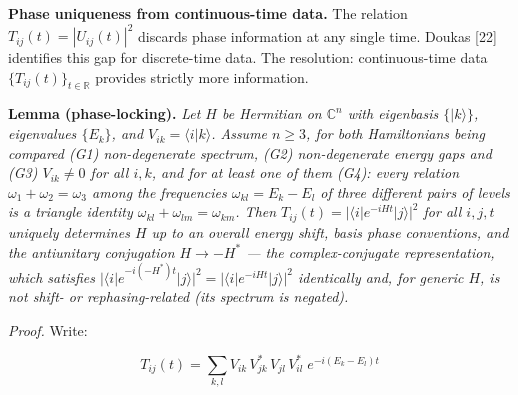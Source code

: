 \documentclass[
]{article}
\begin{document}
\textbf{Phase uniqueness from continuous-time data.} The relation
\(T_{ij}(t) = |U_{ij}(t)|^2\) discards phase information at any single
time. Doukas {[}22{]} identifies this gap for discrete-time data. The
resolution: continuous-time data \(\{T_{ij}(t)\}_{t \in \mathbb{R}}\)
provides strictly more information.

\textbf{Lemma (phase-locking).} \emph{Let \(H\) be Hermitian on
\(\mathbb{C}^n\) with eigenbasis \(\{|k\rangle\}\), eigenvalues
\(\{E_k\}\), and \(V_{ik} = \langle i | k \rangle\). Assume \(n\ge3\),
for both Hamiltonians being compared (G1) non-degenerate spectrum, (G2)
non-degenerate energy gaps and (G3) \(V_{ik} \neq 0\) for all \(i, k\),
and for at least one of them (G4): every relation
\(\omega_1 + \omega_2 = \omega_3\) among the frequencies
\(\omega_{kl} = E_k - E_l\) of three different pairs of levels is a
triangle identity \(\omega_{kl} + \omega_{lm} = \omega_{km}\). Then
\(T_{ij}(t) = |\langle i | e^{-iHt} | j \rangle|^2\) for all \(i, j, t\)
uniquely determines \(H\) up to an overall energy shift, basis phase
conventions, and the antiunitary conjugation \(H \to -H^*\) --- the
complex-conjugate representation, which satisfies
\(|\langle i|e^{-i(-H^*)t}|j\rangle|^2 = |\langle i|e^{-iHt}|j\rangle|^2\)
identically and, for generic \(H\), is not shift- or rephasing-related
(its spectrum is negated).}

\emph{Proof.} Write:

\[T_{ij}(t) = \sum_{k,l} V_{ik}\, V_{jk}^*\, V_{jl}\, V_{il}^*\; e^{-i(E_k - E_l)t}\]
\end{document}
